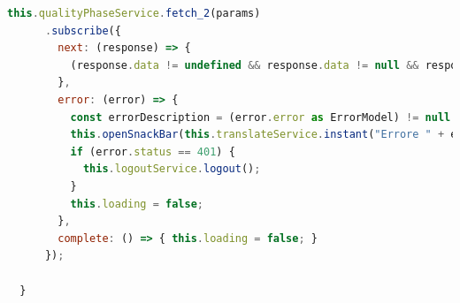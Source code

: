 \begin{lstlisting}[language=JavaScript, caption={Visualizzazione delle fasi - TypeScript}]
    this.qualityPhaseService.fetch_2(params)
      .subscribe({
        next: (response) => {
          (response.data != undefined && response.data != null && response.data.length != 0) ? this.phases = response.data : this.openSnackBar(this.translateService.instant("Errore: non ci sono fasi da visualizzare!"), "X");
        },
        error: (error) => {
          const errorDescription = (error.error as ErrorModel) != null ? (error.error as ErrorModel).description : (error.status == 401 ? "Non autorizzato" : "Errore lato server");
          this.openSnackBar(this.translateService.instant("Errore " + error.status + " - " + errorDescription), "X");
          if (error.status == 401) {
            this.logoutService.logout();
          }
          this.loading = false;
        },
        complete: () => { this.loading = false; }
      });

  }
\end{lstlisting}



